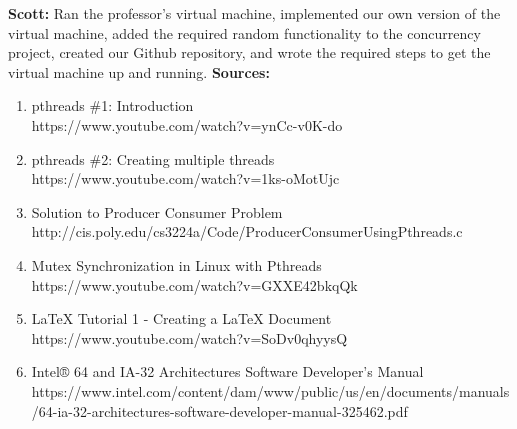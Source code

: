 \documentclass[10pt]{article}
\begin{document}
\textbf{Scott: }Ran the professor's virtual machine, implemented our own version of the virtual machine, added the required random functionality to the concurrency project, created our Github repository, and wrote the required steps to get the virtual machine up and running.
\newpage
\textbf{Sources: }
\begin{enumerate}
	\item pthreads \#1: Introduction\\
	https://www.youtube.com/watch?v=ynCc-v0K-do
	\item pthreads \#2: Creating multiple threads\\
	https://www.youtube.com/watch?v=1ks-oMotUjc
	\item Solution to Producer Consumer Problem\\
	http://cis.poly.edu/cs3224a/Code/ProducerConsumerUsingPthreads.c
	\item Mutex Synchronization in Linux with Pthreads\\
	https://www.youtube.com/watch?v=GXXE42bkqQk
	\item LaTeX Tutorial 1 - Creating a LaTeX Document\\
	https://www.youtube.com/watch?v=SoDv0qhyysQ
	\item Intel® 64 and IA-32 Architectures Software Developer’s Manual\\
	https://www.intel.com/content/dam/www/public/us/en/documents/manuals/64-ia-32-architectures-software-developer-manual-325462.pdf
\end{enumerate}
\end{document}
